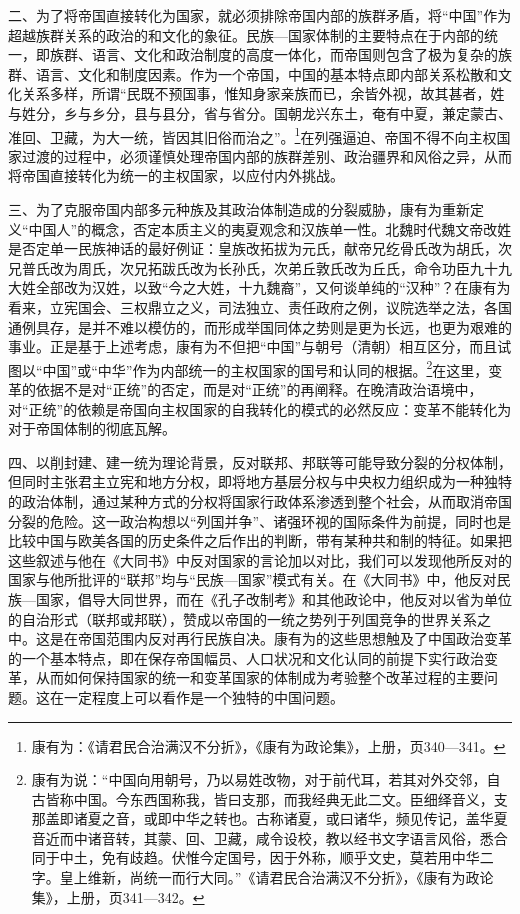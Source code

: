 \documentclass[a4paper, 12pt, openright]{ctexbook}
\begin{document}
二、为了将帝国直接转化为国家，就必须排除帝国内部的族群矛盾，将“中国”作为超越族群关系的政治的和文化的象征。民族—国家体制的主要特点在于内部的统一，即族群、语言、文化和政治制度的高度一体化，而帝国则包含了极为复杂的族群、语言、文化和制度因素。作为一个帝国，中国的基本特点即内部关系松散和文化关系多样，所谓“民既不预国事，惟知身家亲族而已，余皆外视，故其甚者，姓与姓分，乡与乡分，县与县分，省与省分。国朝龙兴东土，奄有中夏，兼定蒙古、准回、卫藏，为大一统，皆因其旧俗而治之”。\footnote{康有为：《请君民合治满汉不分折》，《康有为政论集》，上册，页340—341。}在列强逼迫、帝国不得不向主权国家过渡的过程中，必须谨慎处理帝国内部的族群差别、政治疆界和风俗之异，从而将帝国直接转化为统一的主权国家，以应付内外挑战。

三、为了克服帝国内部多元种族及其政治体制造成的分裂威胁，康有为重新定义“中国人”的概念，否定本质主义的夷夏观念和汉族单一性。北魏时代魏文帝改姓是否定单一民族神话的最好例证：皇族改拓拔为元氏，献帝兄纥骨氏改为胡氏，次兄普氏改为周氏，次兄拓跋氏改为长孙氏，次弟丘敦氏改为丘氏，命令功臣九十九大姓全部改为汉姓，以致“今之大姓，十九魏裔”，又何谈单纯的“汉种”？在康有为看来，立宪国会、三权鼎立之义，司法独立、责任政府之例，议院选举之法，各国通例具存，是并不难以模仿的，而形成举国同体之势则是更为长远，也更为艰难的事业。正是基于上述考虑，康有为不但把“中国”与朝号（清朝）相互区分，而且试图以“中国”或“中华”作为内部统一的主权国家的国号和认同的根据。\footnote{康有为说：“中国向用朝号，乃以易姓改物，对于前代耳，若其对外交邻，自古皆称中国。今东西国称我，皆曰支那，而我经典无此二文。臣细绎音义，支那盖即诸夏之音，或即中华之转也。古称诸夏，或曰诸华，频见传记，盖华夏音近而中诸音转，其蒙、回、卫藏，咸令设校，教以经书文字语言风俗，悉合同于中土，免有歧趋。伏惟今定国号，因于外称，顺乎文史，莫若用中华二字。皇上维新，尚统一而行大同。”《请君民合治满汉不分折》，《康有为政论集》，上册，页341—342。}在这里，变革的依据不是对“正统”的否定，而是对“正统”的再阐释。在晚清政治语境中，对“正统”的依赖是帝国向主权国家的自我转化的模式的必然反应：变革不能转化为对于帝国体制的彻底瓦解。

四、以削封建、建一统为理论背景，反对联邦、邦联等可能导致分裂的分权体制，但同时主张君主立宪和地方分权，即将地方基层分权与中央权力组织成为一种独特的政治体制，通过某种方式的分权将国家行政体系渗透到整个社会，从而取消帝国分裂的危险。这一政治构想以“列国并争”、诸强环视的国际条件为前提，同时也是比较中国与欧美各国的历史条件之后作出的判断，带有某种共和制的特征。如果把这些叙述与他在《大同书》中反对国家的言论加以对比，我们可以发现他所反对的国家与他所批评的“联邦”均与“民族—国家”模式有关。在《大同书》中，他反对民族—国家，倡导大同世界，而在《孔子改制考》和其他政论中，他反对以省为单位的自治形式（联邦或邦联），赞成以帝国的一统之势列于列国竞争的世界关系之中。这是在帝国范围内反对再行民族自决。康有为的这些思想触及了中国政治变革的一个基本特点，即在保存帝国幅员、人口状况和文化认同的前提下实行政治变革，从而如何保持国家的统一和变革国家的体制成为考验整个改革过程的主要问题。这在一定程度上可以看作是一个独特的中国问题。
\end{document}
